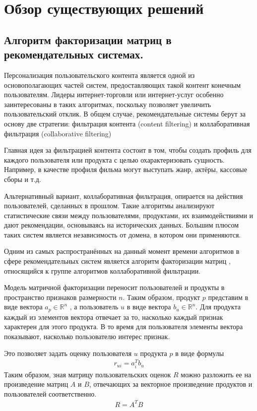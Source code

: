 \documentclass[times,specification,annotation]{itmo-student-thesis}
\begin{document}
\section{Обзор существующих решений}

\subsection{Алгоритм факторизации матриц в рекомендательных системах.}\label{sec:als}

Персонализация пользовательского контента является одной из основополагающих частей систем, предоставляющих такой контент конечным пользователям. Лидеры интернет-торговли или интернет-услуг особенно заинтересованы в таких алгоритмах, поскольку позволяет увеличить пользовательский отклик.
В общем случае, рекомендательные системы берут за основу две стратегии: фильтрация контента (content filtering) \cite{Lops2011,} и коллаборативная фильтрация (collaborative filtering)
  
Главная идея за фильтрацией контента состоит в том, чтобы создать профиль для каждого пользователя или продукта с целью охарактеризовать сущность. Например, в качестве профиля фильма могут выступать жанр, актёры, кассовые сборы и т.д.

Альтернативный вариант, коллаборативная фильтрация, опирается на действия пользователей, сделанных в прошлом. Такие алгоритмы анализируют статистические связи между пользователями, продуктами, их взаимодействиями и дают рекомендации, основываясь на исторических данных.  Большим плюсом таких систем является независимость от домена, в котором они применяются.

Одним из самых распространённых на данный момент времени алгоритмов в сфере рекомендательных систем является алгоритм факторизации матриц \cite{koren2009}, относящийся к группе алгоритмов коллаборативной фильтрации.

Модель матричной факторизации переносит пользователей и продукты в пространство признаков размерности $n$. Таким образом, продукт $p$ представим в виде вектора $a_{p} \in \mathbb{R}^n$ , а пользователь $u$ в виде вектора $b_{u} \in \mathbb{R}^n$. Для продукта каждый из элементов вектора отвечает за то, насколько каждый признак характерен для  этого продукта. В то время для пользователя элементы вектора показывают, насколько пользователю интерес признак.

Это позволяет задать оценку пользователя $u$ продукта $p$ в виде формулы
 \begin{align*}
r_{ui} = a_{i}^{T}b_{u}
\end{align*}
Таким образом, зная матрицу пользовательских оценок $R$ можно разложить ее на произведение матриц $A$ и $B$, отвечающих за векторное произведение продуктов и пользователей соответственно.
 \begin{align*}
R = A^TB
\end{align*}
\end{document}
